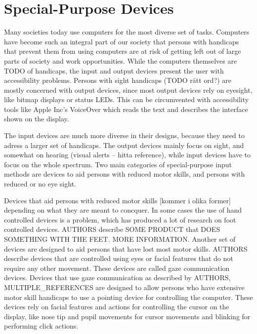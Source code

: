 \section{Special-Purpose Devices}

Many societies today use computers for the most diverse set of tasks. Computers have become such an integral part of our society that persons with handicaps that prevent them from using computers are at risk of getting left out of large parts of society and work opportunities. While the computers themselves are TODO of handicaps, the input and output devices present the user with accessibility problems. Persons with sight handicaps (TODO rätt ord?) are mostly concerned with output devices, since most output devices rely on eyesight, like bitmap displays or status LEDs. This can be circumvented with accessibility tools like Apple Inc's VoiceOver which reads the text and describes the interface shown on the display.

The input devices are much more diverse in their designs, because they need to adress a larger set of handicaps. The output devices mainly focus on sight, and somewhat on hearing (visual alerts -- hitta reference), while input devices have to focus on the whole spectrum. Two main categories of special-purpose input methods are devices to aid persons with reduced motor skills, and persons with reduced or no eye sight. 

Devices that aid persons with reduced motor skills [kommer i olika former] depending on what they are meant to concquer. In some cases the use of hand controlled devices is a problem, which has produced a lot of research on foot controlled devices. AUTHORS describe SOME PRODUCT that DOES SOMETHING WITH THE FEET. MORE INFORMATION. Another set of devices are designed to aid persons that have lost most motor skills. AUTHORS describe devices that are controlled using eyes or facial features that do not require any other movement. These devices are called gaze communication devices. Devices that use gaze communication as described by AUTHORS, MULTIPLE\_REFERENCES are designed to allow persons who have extensive motor skill handicaps to use a pointing device for controlling the computer. These devices rely on facial features and actions for controlling the cursor on the display, like nose tip and pupil movements for cursor movements and blinking for performing click actions.

